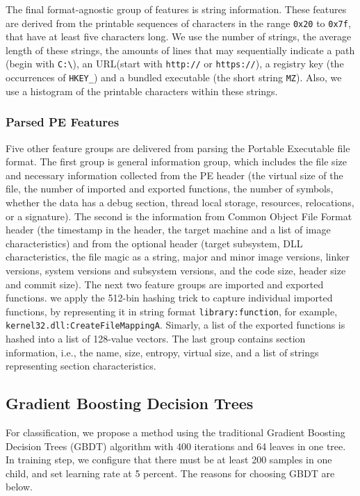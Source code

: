 \documentclass[runningheads]{llncs}
\begin{document}
The final format-agnostic group of features is string information. These features are derived from the printable sequences of characters in the range \verb|0x20| to \verb|0x7f|, that have at least five characters long. We use the number of strings, the average length of these strings, the amounts of lines  that may sequentially indicate a path (begin with \verb|C:\|), an URL(start with \verb|http://| or \verb|https://|), a registry key (the occurrences of \verb|HKEY_|) and a bundled executable (the short string \verb|MZ|). Also, we use a histogram of the printable characters within these strings.

\subsubsection{Parsed PE Features}

Five other feature groups are delivered from parsing the Portable Executable file format. The first group is general information group, which includes the file size and necessary information collected from the PE header (the virtual size of the file, the number of imported and exported functions, the number of symbols, whether the data has a debug section, thread local storage, resources, relocations, or a signature). The second is the information from Common Object File Format header (the timestamp in the header, the target machine and a list of image characteristics) and from the optional header (target subsystem, DLL  characteristics,  the file magic as a string, major and minor image versions, linker versions, system versions and subsystem versions, and the code size, header size and commit size). The next two feature groups are imported and exported functions. we apply the 512-bin hashing trick to capture individual imported functions, by representing it in string format \verb|library:function|, for example, \verb|kernel32.dll:CreateFileMappingA|. Simarly, a list of the exported functions is hashed into a list of 128-value vectors. The last group contains section information, i.e., the name, size, entropy, virtual size, and a list of strings representing section characteristics.

\subsection{Gradient Boosting Decision Trees}

For classification, we propose a method using the traditional Gradient Boosting Decision Trees (GBDT) algorithm with 400 iterations and 64 leaves in one tree. In training step, we configure that there must be at least 200 samples in one child, and set learning rate at 5 percent. The reasons for choosing GBDT are below.
\end{document}
